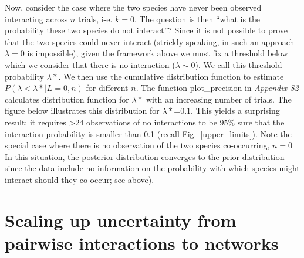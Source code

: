 \documentclass[12pt]{article}
\begin{document}
    Now, consider the case where the two species have never been observed interacting across $n$ trials, i-e. $k=0$. The question is then ``what is the probability these two species do not interact''? Since it is not possible to prove that the two species could never interact (strickly speaking, in such an approach $\lambda=0$ is impossible), given the framework above we must fix a threshold below which we consider that there is no interaction ($\lambda \sim 0$). We call this threshold probability $\lambda*$. We then use the cumulative distribution function to estimate $P(\lambda<\lambda*|L=0,n)$ for different $n$. The 
    function plot\_precision in \emph{Appendix S2} calculates distribution function for $\lambda*$ with an increasing number of trials. The figure below illustrates this distribution for $\lambda*$=0.1. This yields a surprising result: it requires \textgreater24 observations of no interactions to be 95\% sure that the interaction probability is smaller than 0.1 (recall Fig.~\ref{upper_limits}). Note the special case where there is no observation of the two species co-occurring, $n = 0$  In this situation, the posterior distribution converges to the prior distribution since the data include no information on the probability with which species might interact should they co-occur; see above).

\section*{Scaling up uncertainty from pairwise interactions to networks}
\end{document}
